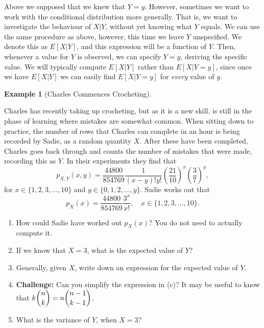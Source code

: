 \documentclass[
  letterpaper,
  DIV=11,
  numbers=noendperiod]{scrreprt}
\providecommand{\tightlist}{%
  \setlength{\itemsep}{0pt}\setlength{\parskip}{0pt}}\usepackage{longtable,booktabs,array}
\theoremstyle{definition}
\theoremstyle{definition}
\newtheorem{example}{Example}[chapter]
\theoremstyle{definition}
\theoremstyle{remark}
\begin{document}
Above we supposed that we knew that \(Y=y\). However, sometimes we want
to work with the conditional distribution more generally. That is, we
want to investigate the behaviour of \(X|Y\), without yet knowing what
\(Y\) equals. We can use the same procedure as above, however, this time
we leave \(Y\) unspecified. We denote this as \(E[X|Y]\), and this
expression will be a function of \(Y\). Then, whenever a value for \(Y\)
is observed, we can specify \(Y=y\), deriving the specific value. We
will typically compute \(E[X|Y]\) rather than \(E[X|Y=y]\), since once
we have \(E[X|Y]\) we can easily find \(E[X|Y=y]\) for \emph{every}
value of \(y\).

\begin{example}[Charles Commences
Crocheting]\protect\hypertarget{exm-conditional-expectation}{}\label{exm-conditional-expectation}

Charles has recently taking up crocheting, but as it is a new skill, is
still in the phase of learning where mistakes are somewhat common. When
sitting down to practice, the number of rows that Charles can complete
in an hour is being recorded by Sadie, as a random quantity \(X\). After
these have been completed, Charles goes back through and counts the
number of mistakes that were made, recording this as \(Y\). In their
experiments they find that
\[p_{X,Y}(x,y) = \frac{44800}{854769} \frac{1}{(x-y)!y!} \left(\frac{21}{10}\right)^x\left(\frac{3}{7}\right)^{y}, \]
for \(x \in \{1,2,3,\dots,10\}\) and \(y \in\{0,1,2,\dots,y\}\). Sadie
works out that
\[p_X(x) = \frac{44800}{854769} \frac{3^x}{x!}, \quad x\in\{1,2,3,\dots,10\}.\]

\begin{enumerate}
\def\labelenumi{\alph{enumi}.}
\tightlist
\item
  How could Sadie have worked out \(p_X(x)\)? You do not need to
  actually compute it.
\item
  If we know that \(X = 3\), what is the expected value of \(Y\)?
\item
  Generally, given \(X\), write down an expression for the expected
  value of \(Y\).
\item
  \textbf{Challenge:} Can you simplify the expression in (c)? It may be
  useful to know that \(k\dbinom{n}{k} = n\dbinom{n-1}{k-1}\).
\item
  What is the variance of \(Y\), when \(X=3\)?
\end{enumerate}

\begin{tcolorbox}[enhanced jigsaw, colback=white, colframe=quarto-callout-color-frame, arc=.35mm, leftrule=.75mm, rightrule=.15mm, opacityback=0, breakable, bottomrule=.15mm, left=2mm, toprule=.15mm]


\end{tcolorbox}
\end{example}
\end{document}
